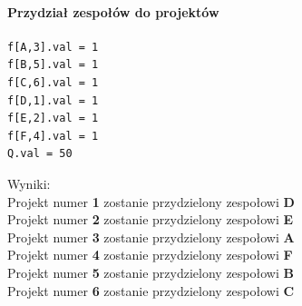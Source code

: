 \paragraph{Przydział zespołów do projektów}
\begin{lstlisting}[caption=wynik z glpk]
f[A,3].val = 1
f[B,5].val = 1
f[C,6].val = 1
f[D,1].val = 1
f[E,2].val = 1
f[F,4].val = 1
Q.val = 50
\end{lstlisting}
Wyniki: \\
Projekt numer \textbf{1} zostanie przydzielony zespołowi \textbf{D} \\
Projekt numer \textbf{2} zostanie przydzielony zespołowi \textbf{E} \\
Projekt numer \textbf{3} zostanie przydzielony zespołowi \textbf{A} \\
Projekt numer \textbf{4} zostanie przydzielony zespołowi \textbf{F} \\
Projekt numer \textbf{5} zostanie przydzielony zespołowi \textbf{B} \\
Projekt numer \textbf{6} zostanie przydzielony zespołowi \textbf{C} \\
